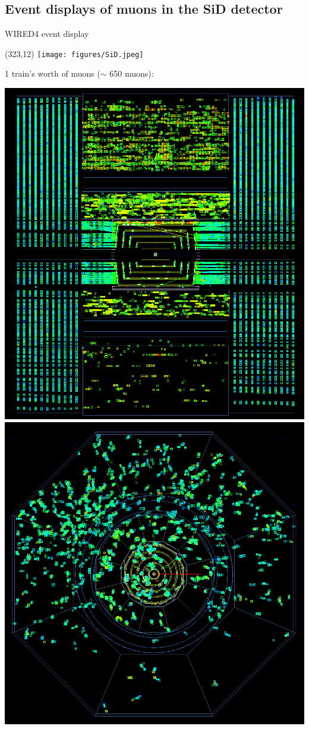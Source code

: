 \documentclass[xcolor={dvipsnames}]{beamer}
\newcommand{\sidlogo}{
  \setlength{\TPHorizModule}{1pt}
  \setlength{\TPVertModule}{1pt}
  \begin{textblock}{1}(323,12)
   \texttt{[image: figures/SiD.jpeg]}
  \end{textblock}
  }
\begin{document}
\subsection{Event displays of muons in the SiD detector}
\begin{frame}{WIRED4 event display}
\sidlogo
1 train's worth of muons ($\sim$ 650 muons):
\begin{center}
\includegraphics[height=0.6\textheight]{sidloi3_muons_wired4_eventdisplay_1bunch.png}
\hspace*{0.2cm}
\includegraphics[height=0.6\textheight]{sidloi3_muons_wired4_eventdisplay_xy_view_1bunch.png}

\end{center}
\end{frame}
\end{document}
